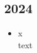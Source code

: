\subsection*{2024}
\begin{history}


    \begin{itemize}

        \item x\\
              text

    \end{itemize}

\end{history}
